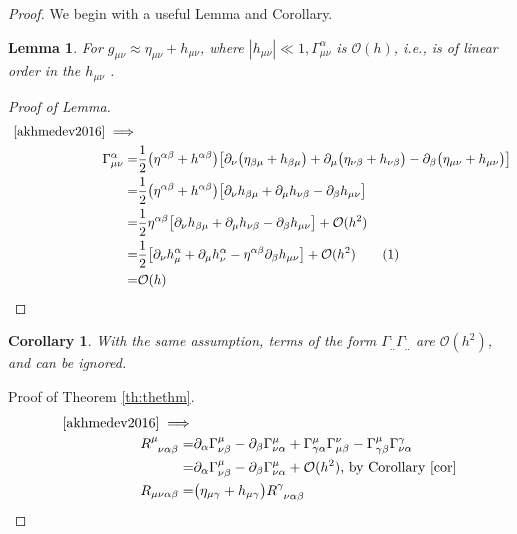 \documentclass[]{article}
\newtheorem{lemma}[theorem]{Lemma}
\newtheorem{corollary}[theorem]{Corollary}
\newcommand\numberthis{\addtocounter{equation}{1}\tag{\theequation}}
\begin{document}
\begin{proof}
	We begin with a useful Lemma and Corollary.
	\begin{lemma}\label{lemma:gamma}
		For $g_{\mu\nu} \approx \eta_{\mu\nu} + h_{\mu\nu}$, where $|h_{\mu\nu}| \ll 1,  \Gamma^{\alpha}_{\mu\nu}$ is $\mathcal{O}(h)$, i.e., is of linear order in the $h_{\mu\nu}$ .
	\end{lemma}
    \begin{proof}[Proof of Lemma]
    	\begin{align*}
    	\text{	\cite[(46)]{akhmedev2016}}\implies&\\
    	\Gamma^{\alpha}_{\mu\nu} =& \frac{1}{2} \big(\eta^{\alpha\beta}+h^{\alpha\beta}\big)\big[\partial_{\nu}\big(\eta_{\beta\mu}+h_{\beta\mu}\big)+\partial_{\mu}\big(\eta_{\nu\beta}+h_{\nu\beta}\big)-\partial_{\beta}\big(\eta_{\mu\nu}+h_{\mu\nu}\big)\big] \\
    	=& \frac{1}{2} \big(\eta^{\alpha\beta}+h^{\alpha\beta}\big)\big[\partial_{\nu}h_{\beta\mu}+\partial_{\mu}h_{\nu\beta}-\partial_{\beta}h_{\mu\nu}\big]\\
    	=& \frac{1}{2} \eta^{\alpha\beta}\big[\partial_{\nu}h_{\beta\mu}+\partial_{\mu}h_{\nu\beta}-\partial_{\beta}h_{\mu\nu}\big] + \mathcal{O}(h^2)\\
    	=& \frac{1}{2} \big[\partial_{\nu}h^{\alpha}_{\mu}+\partial_{\mu}h^{\alpha}_{\nu}-\eta^{\alpha\beta}\partial_{\beta}h_{\mu\nu}\big] + \mathcal{O}(h^2) \numberthis\label{eq:Gamma} \\
    	=& \mathcal{O}(h)
    	\end{align*}
    \end{proof}
	\begin{corollary}\label{cor}
		With the same assumption, terms of the form $\Gamma^{.}_{..}\Gamma^{.}_{..}$ are $\mathcal{O}(h^2)$, and can be ignored.
	\end{corollary}
	Proof of Theorem \ref{th:thethm}.
	\begin{align*}
	\text{\cite[(53)]{akhmedev2016}}\implies&\\
	R\indices{^{\mu}_{\nu\alpha\beta}}=&\partial_{\alpha}\Gamma^{\mu}_{\nu\beta} - \partial_{\beta}\Gamma^{\mu}_{\nu\alpha} + \Gamma^{\mu}_{\gamma\alpha}\Gamma^{\nu}_{\mu\beta} - \Gamma^{\mu}_{\gamma\beta} \Gamma^{\gamma}_{\nu\alpha}\\
	=& \partial_{\alpha}\Gamma^{\mu}_{\nu\beta} - \partial_{\beta}\Gamma^{\mu}_{\nu\alpha} + \mathcal{O}(h^2)\text{, by Corollary \ref{cor}}\\
	R_{\mu\nu\alpha\beta} =&\big(\eta_{\mu\gamma}+h_{\mu\gamma}\big)	R\indices{^{\gamma}_{\nu\alpha\beta}}\\

\end{align*}
\end{proof}
\end{document}
